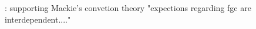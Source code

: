 \documentclass[12pt,]{article}
\begin{document}











 \cite{Shel-Wand11}:  supporting Mackie's convetion theory "expections regarding fgc are interdependent...."



\end{document}
